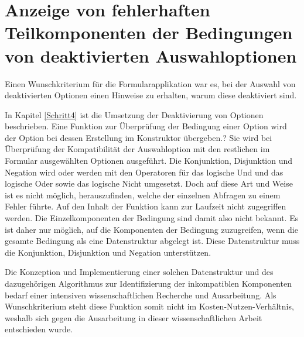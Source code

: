 \section{Anzeige von fehlerhaften Teilkomponenten der Bedingungen von deaktivierten Auswahloptionen}
\label{sec:Anzeige-von-fehlerhaften-Teilkomponenten-der-Bedingungen-von-deaktivierten-Auswahloptionen}


Einen Wunschkriterium für die Formularapplikation war es,
bei der Auswahl von deaktivierten Optionen einen Hinweise zu erhalten,
warum diese deaktiviert sind.

In Kapitel \ref{Schritt4} ist die Umsetzung der Deaktivierung von Optionen beschrieben.
Eine Funktion zur Überprüfung der Bedingung einer Option wird der Option bei dessen Erstellung im Konstruktor übergeben.?
Sie wird bei Überprüfung der Kompatibilität der Auswahloption mit den restlichen im Formular ausgewählten Optionen ausgeführt.
Die Konjunktion, Disjunktion und Negation wird oder werden mit den Operatoren für das logische Und und das logische Oder sowie das logische Nicht umgesetzt.
Doch auf diese Art und Weise ist es nicht möglich,
herauszufinden,
welche der einzelnen Abfragen zu einem Fehler führte.
Auf den Inhalt der Funktion kann zur Laufzeit nicht zugegriffen werden.
Die Einzelkomponenten der Bedingung sind damit also nicht bekannt. 
Es ist daher nur möglich,
auf die Komponenten der Bedingung zuzugreifen,
wenn die gesamte Bedingung als eine Datenstruktur abgelegt ist.
Diese Datenstruktur muss die Konjunktion, Disjunktion und Negation unterstützen.

Die Konzeption und Implementierung einer solchen Datenstruktur und des dazugehörigen Algorithmus zur Identifizierung der inkompatiblen Komponenten bedarf einer intensiven wissenschaftlichen Recherche und Ausarbeitung.
Als Wunschkriterium steht diese Funktion somit nicht im Kosten-Nutzen-Verhältnis, weshalb sich gegen die Ausarbeitung in dieser wissenschaftlichen Arbeit entschieden wurde.

